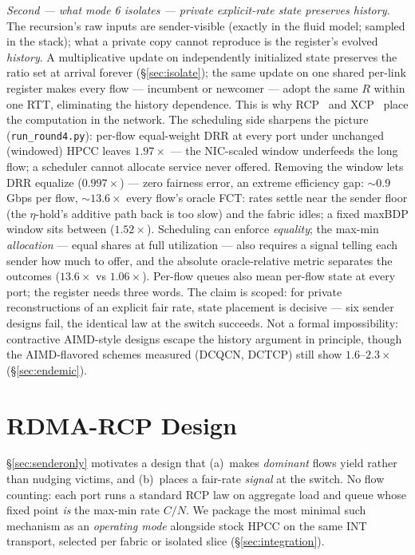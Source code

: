 \documentclass[sigconf, nonacm]{acmart}
\begin{document}
\emph{Second --- what mode 6 isolates --- private explicit-rate state preserves history.}
The recursion's raw inputs are sender-visible (exactly in the fluid model; sampled in the
stack); what a private copy cannot reproduce is the register's evolved \emph{history}. A multiplicative
update on independently initialized state preserves the ratio set at arrival forever
(\S\ref{sec:isolate}); the same update on one shared per-link register makes every flow ---
incumbent or newcomer --- adopt the same $R$ within one RTT, eliminating the history
dependence. This is why RCP~\cite{dukkipati2006fct,dukkipati2008rcp} and
XCP~\cite{katabi2002xcp} place the computation in the network. The scheduling side sharpens
the picture (\texttt{run\_round4.py}): per-flow equal-weight DRR at every port under
unchanged (windowed) HPCC leaves $1.97\times$ --- the NIC-scaled window underfeeds the long
flow; a scheduler cannot allocate service never offered. Removing the
window lets DRR equalize ($0.997\times$) --- zero fairness error, an extreme efficiency gap:
${\sim}0.9$ Gbps per flow, ${\sim}13.6\times$ every flow's oracle FCT: rates settle near the sender floor (the
$\eta$-hold's additive path back is too slow) and the fabric idles; a fixed maxBDP window
sits between ($1.52\times$). Scheduling can enforce
\emph{equality}; the max-min \emph{allocation} --- equal shares at full utilization --- also
requires a signal telling each sender how much to offer, and the absolute oracle-relative metric
separates the outcomes ($13.6\times$ vs $1.06\times$). Per-flow queues also mean per-flow
state at every port; the register needs three words. The claim is scoped: for private reconstructions of an
explicit fair rate, state placement is decisive --- six sender designs fail, the identical
law at the switch succeeds. Not a formal impossibility: contractive AIMD-style designs escape
the history argument in principle, though the AIMD-flavored schemes measured (DCQCN, DCTCP)
still show $1.6$--$2.3\times$ (\S\ref{sec:endemic}).

\section{RDMA-RCP Design}
\label{sec:design}

\S\ref{sec:senderonly} motivates a design that (a)~makes \emph{dominant} flows yield
rather than nudging victims, and (b)~places a fair-rate \emph{signal} at the switch. No flow
counting: each port runs a standard RCP law on aggregate load and queue whose fixed point
\emph{is} the max-min rate $C/N$. We package the most minimal such mechanism as an \emph{operating mode} alongside stock
HPCC on the same INT transport, selected per fabric or isolated slice
(\S\ref{sec:integration}).
\end{document}
